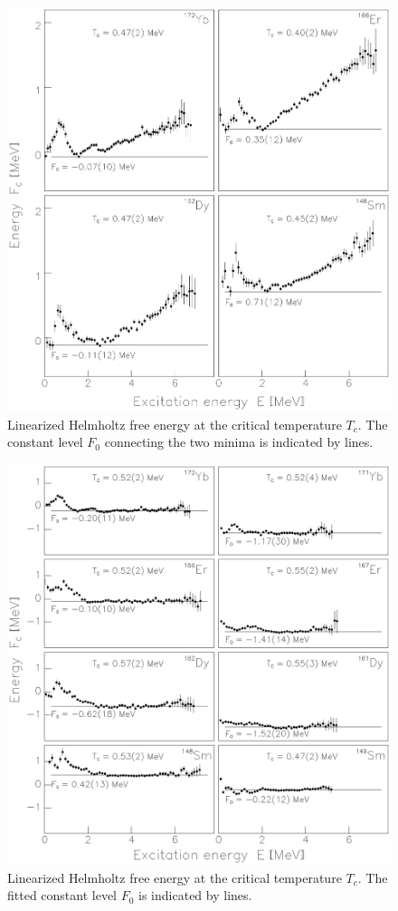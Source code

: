 \begin{figure}
\includegraphics[totalheight=20cm,angle=0,bb=0 20 350 730]{fig4.ps}
\caption{Linearized Helmholtz free energy at the critical temperature $T_c$. 
The constant level $F_0$ connecting the two minima is indicated by lines.}
\label{fig:fig4}
\end{figure}

\clearpage

\begin{figure}
\includegraphics[totalheight=20cm,angle=0,bb=0 20 350 730]{fig5.ps}
\caption{Linearized Helmholtz free energy at the critical temperature $T_c$. 
The fitted constant level $F_0$ is indicated by lines.}
\label{fig:fig5}
\end{figure}

